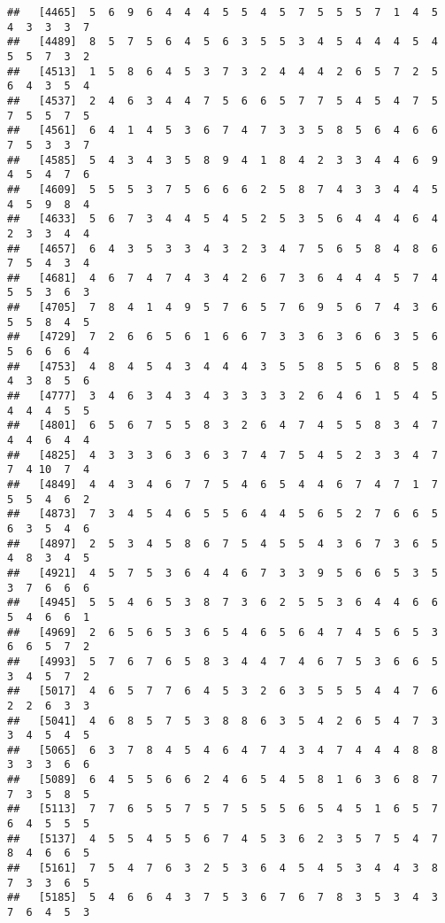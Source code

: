 \documentclass[
]{book}
\begin{document}
\begin{verbatim}
##   [4465]  5  6  9  6  4  4  4  5  5  4  5  7  5  5  5  7  1  4  5  4  3  3  3  7
##   [4489]  8  5  7  5  6  4  5  6  3  5  5  3  4  5  4  4  4  5  4  5  5  7  3  2
##   [4513]  1  5  8  6  4  5  3  7  3  2  4  4  4  2  6  5  7  2  5  6  4  3  5  4
##   [4537]  2  4  6  3  4  4  7  5  6  6  5  7  7  5  4  5  4  7  5  7  5  5  7  5
##   [4561]  6  4  1  4  5  3  6  7  4  7  3  3  5  8  5  6  4  6  6  7  5  3  3  7
##   [4585]  5  4  3  4  3  5  8  9  4  1  8  4  2  3  3  4  4  6  9  4  5  4  7  6
##   [4609]  5  5  5  3  7  5  6  6  6  2  5  8  7  4  3  3  4  4  5  4  5  9  8  4
##   [4633]  5  6  7  3  4  4  5  4  5  2  5  3  5  6  4  4  4  6  4  2  3  3  4  4
##   [4657]  6  4  3  5  3  3  4  3  2  3  4  7  5  6  5  8  4  8  6  7  5  4  3  4
##   [4681]  4  6  7  4  7  4  3  4  2  6  7  3  6  4  4  4  5  7  4  5  5  3  6  3
##   [4705]  7  8  4  1  4  9  5  7  6  5  7  6  9  5  6  7  4  3  6  5  5  8  4  5
##   [4729]  7  2  6  6  5  6  1  6  6  7  3  3  6  3  6  6  3  5  6  5  6  6  6  4
##   [4753]  4  8  4  5  4  3  4  4  4  3  5  5  8  5  5  6  8  5  8  4  3  8  5  6
##   [4777]  3  4  6  3  4  3  4  3  3  3  3  2  6  4  6  1  5  4  5  4  4  4  5  5
##   [4801]  6  5  6  7  5  5  8  3  2  6  4  7  4  5  5  8  3  4  7  4  4  6  4  4
##   [4825]  4  3  3  3  6  3  6  3  7  4  7  5  4  5  2  3  3  4  7  7  4 10  7  4
##   [4849]  4  4  3  4  6  7  7  5  4  6  5  4  4  6  7  4  7  1  7  5  5  4  6  2
##   [4873]  7  3  4  5  4  6  5  5  6  4  4  5  6  5  2  7  6  6  5  6  3  5  4  6
##   [4897]  2  5  3  4  5  8  6  7  5  4  5  5  4  3  6  7  3  6  5  4  8  3  4  5
##   [4921]  4  5  7  5  3  6  4  4  6  7  3  3  9  5  6  6  5  3  5  3  7  6  6  6
##   [4945]  5  5  4  6  5  3  8  7  3  6  2  5  5  3  6  4  4  6  6  5  4  6  6  1
##   [4969]  2  6  5  6  5  3  6  5  4  6  5  6  4  7  4  5  6  5  3  6  6  5  7  2
##   [4993]  5  7  6  7  6  5  8  3  4  4  7  4  6  7  5  3  6  6  5  3  4  5  7  2
##   [5017]  4  6  5  7  7  6  4  5  3  2  6  3  5  5  5  4  4  7  6  2  2  6  3  3
##   [5041]  4  6  8  5  7  5  3  8  8  6  3  5  4  2  6  5  4  7  3  3  4  5  4  5
##   [5065]  6  3  7  8  4  5  4  6  4  7  4  3  4  7  4  4  4  8  8  3  3  3  6  6
##   [5089]  6  4  5  5  6  6  2  4  6  5  4  5  8  1  6  3  6  8  7  7  3  5  8  5
##   [5113]  7  7  6  5  5  7  5  7  5  5  5  6  5  4  5  1  6  5  7  6  4  5  5  5
##   [5137]  4  5  5  4  5  5  6  7  4  5  3  6  2  3  5  7  5  4  7  8  4  6  6  5
##   [5161]  7  5  4  7  6  3  2  5  3  6  4  5  4  5  3  4  4  3  8  7  3  3  6  5
##   [5185]  5  4  6  6  4  3  7  5  3  6  7  6  7  8  3  5  3  4  3  7  6  4  5  3

\end{verbatim}
\end{document}
